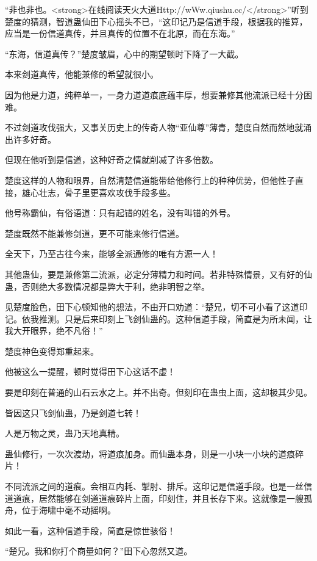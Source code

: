 
\begin{this_body}

“非也非也。<strong>在线阅读天火大道Http://wWw.qiushu.cc/</strong>”听到楚度的猜测，智道蛊仙田下心摇头不已，“这印记乃是信道手段，根据我的推算，应当是一份信道真传，并且真传的位置不在北原，而在东海。”

“东海，信道真传？”楚度皱眉，心中的期望顿时下降了一大截。

本来剑道真传，他能兼修的希望就很小。

因为他是力道，纯粹单一，一身力道道痕底蕴丰厚，想要兼修其他流派已经十分困难。

不过剑道攻伐强大，又事关历史上的传奇人物“亚仙尊”薄青，楚度自然而然地就涌出许多好奇。

但现在他听到是信道，这种好奇之情就削减了许多倍数。

楚度这样的人物和眼界，自然清楚信道能带给他修行上的种种优势，但他性子直接，雄心壮志，骨子里更喜欢攻伐手段多些。

他号称霸仙，有俗语道：只有起错的姓名，没有叫错的外号。

楚度既然不能兼修剑道，更不可能来修行信道。

全天下，乃至古往今来，能够全派通修的唯有方源一人！

其他蛊仙，要是兼修第二流派，必定分薄精力和时间。若非特殊情景，又有好的仙蛊，否则绝大多数情况都是弊大于利，绝非明智之举。

见楚度脸色，田下心顿知他的想法，不由开口劝道：“楚兄，切不可小看了这道印记。依我推测。只是后来印刻上飞剑仙蛊的。这种信道手段，简直是为所未闻，让我大开眼界，绝不凡俗！”

楚度神色变得郑重起来。

他被这么一提醒，顿时觉得田下心这话不虚！

要是印刻在普通的山石云水之上。并不出奇。但刻印在蛊虫上面，这却极其少见。

皆因这只飞剑仙蛊，乃是剑道七转！

人是万物之灵，蛊乃天地真精。

蛊仙修行，一次次渡劫，将道痕加身。而仙蛊本身，则是一小块一小块的道痕碎片！

不同流派之间的道痕。会相互内耗、掣肘、排斥。这印记是信道手段。也是一丝信道道痕，居然能够在剑道道痕碎片上面，印刻住，并且长存下来。这就像是一艘孤舟，位于海啸中毫不动摇啊。

如此一看，这种信道手段，简直是惊世骇俗！

“楚兄。我和你打个商量如何？”田下心忽然又道。


\end{this_body}
